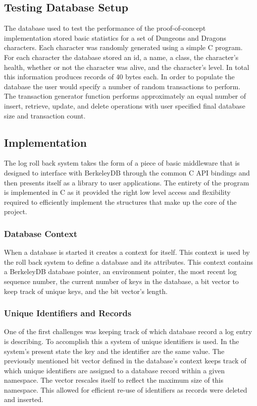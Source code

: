 \documentclass{article}
\begin{document}
\subsection{Testing Database Setup}

The database used to test the performance of the proof-of-concept implementation stored basic statistics for a set of Dungeons and Dragons characters. Each character was randomly generated using a simple C program. For each character the database stored an id, a name, a class, the character's health, whether or not the character was alive, and the character's level. In total this information produces records of 40 bytes each. In order to populate the database the user would specify a number of random transactions to perform. The transaction generator function performs approximately an equal number of insert, retrieve, update, and delete operations with user specified final database size and transaction count.

\subsection{Implementation}
The log roll back system takes the form of a piece of basic middleware that is designed to interface with BerkeleyDB through the common C API bindings and then presents itself as a library to user applications. The entirety of the program is implemented in C as it provided the right low level access and flexibility required to efficiently implement the structures that make up the core of the project.

\subsubsection{Database Context}
When a database is started it creates a context for itself. This context is used by the roll back system to define a database and its attributes. This context contains a BerkeleyDB database pointer, an environment pointer, the most recent log sequence number, the current number of keys in the database, a bit vector to keep track of unique keys, and the bit vector's length. 

\subsubsection{Unique Identifiers and Records}
One of the first challenges was keeping track of which database record a log entry is describing. To accomplish this a system of unique identifiers is used. In the system's present state the key and the identifier are the same value. The previously mentioned bit vector defined in the database's context keeps track of which unique identifiers are assigned to a database record within a given namespace. The vector rescales itself to reflect the maximum size of this namespace. This allowed for efficient re-use of identifiers as records were deleted and inserted.
\end{document}

